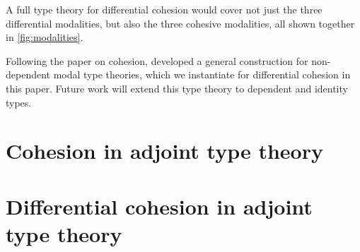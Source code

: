 \documentclass{article}
\begin{document}
A full type theory for differential cohesion would cover
not just the three differential modalities, but also the three cohesive
modalities, all shown together in \cref{fig:modalities}.

Following the \citeyear{Licata2016} paper on cohesion, \citet{Licata2017}
developed a general construction for non-dependent modal type theories, which we
instantiate for differential cohesion in this paper. Future work will extend
this type theory to dependent and identity types.

\section{Cohesion in adjoint type theory}


\section{Differential cohesion in adjoint type theory}





\end{document}
